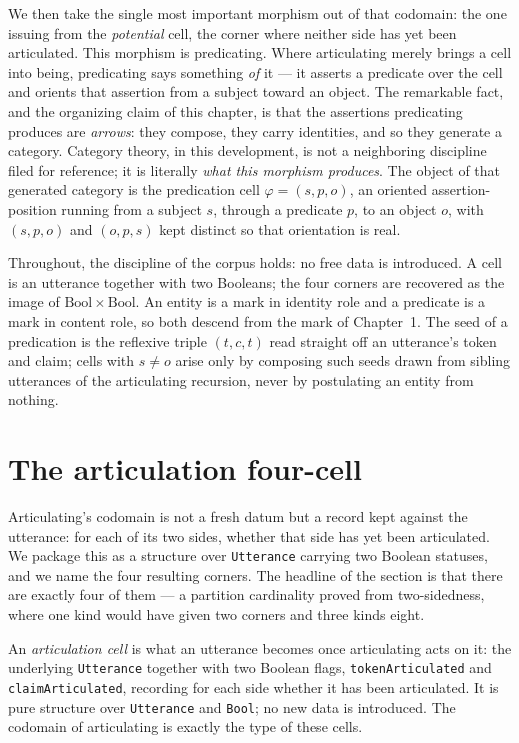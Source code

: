 We then take the single most important morphism out of that codomain: the one issuing from the \emph{potential} cell, the corner where neither side has yet been articulated. This morphism is predicating. Where articulating merely brings a cell into being, predicating says something \emph{of} it --- it asserts a predicate over the cell and orients that assertion from a subject toward an object. The remarkable fact, and the organizing claim of this chapter, is that the assertions predicating produces are \emph{arrows}: they compose, they carry identities, and so they generate a category. Category theory, in this development, is not a neighboring discipline filed for reference; it is literally \emph{what this morphism produces}. The object of that generated category is the predication cell $\varphi = (s, p, o)$, an oriented assertion-position running from a subject $s$, through a predicate $p$, to an object $o$, with $(s,p,o)$ and $(o,p,s)$ kept distinct so that orientation is real.

Throughout, the discipline of the corpus holds: no free data is introduced. A cell is an utterance together with two Booleans; the four corners are recovered as the image of $\mathrm{Bool}\times\mathrm{Bool}$. An entity is a mark in identity role and a predicate is a mark in content role, so both descend from the mark of Chapter~1. The seed of a predication is the reflexive triple $(t, c, t)$ read straight off an utterance's token and claim; cells with $s \neq o$ arise only by composing such seeds drawn from sibling utterances of the articulating recursion, never by postulating an entity from nothing.

\section{The articulation four-cell}

Articulating's codomain is not a fresh datum but a record kept against the utterance: for each of its two sides, whether that side has yet been articulated. We package this as a structure over \texttt{Utterance} carrying two Boolean statuses, and we name the four resulting corners. The headline of the section is that there are exactly four of them --- a partition cardinality proved from two-sidedness, where one kind would have given two corners and three kinds eight.

\begin{definition}\label{def:articulation-cell}\leanok{}
An \emph{articulation cell} is what an utterance becomes once articulating acts on it: the underlying \texttt{Utterance} together with two Boolean flags, \texttt{tokenArticulated} and \texttt{claimArticulated}, recording for each side whether it has been articulated. It is pure structure over \texttt{Utterance} and \texttt{Bool}; no new data is introduced. The codomain of articulating is exactly the type of these cells.
\end{definition}


